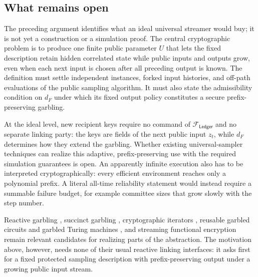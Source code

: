 \subsection{What remains open}

The preceding argument identifies what an ideal universal streamer would buy;
it is not yet a construction or a simulation proof. The central cryptographic
problem is to produce one finite public parameter $U$ that lets the fixed
description retain hidden correlated state while public inputs and outputs
grow, even when each next input is chosen after all preceding output is known.
The definition must settle independent instances, forked input histories, and
off-path evaluations of the public sampling algorithm. It must also state the
admissibility condition on $d_F$ under which its fixed output policy constitutes
a secure prefix-preserving garbling.

At the ideal level, new recipient keys require no command of
$\mathcal F_{\mathsf{Ledger}}$ and no separate linking party: the keys are
fields of the next public input $z_t$, while $d_F$ determines how they extend
the garbling. Whether existing universal-sampler techniques can realize this
adaptive, prefix-preserving use with the required simulation guarantees is open. An
apparently infinite execution also has to be interpreted
cryptographically: every efficient environment reaches only a polynomial
prefix. A literal all-time reliability statement would instead require a
summable failure budget, for example committee sizes that grow slowly with
the step number.

Reactive garbling \cite{NielsenRanellucci2015ReactiveGarbling}, succinct
garbling \cite{LinPass2014SuccinctGarbling}, cryptographic iterators
\cite{KoppulaLewkoWaters2014IOTM}, reusable garbled circuits and garbled
Turing machines
\cite{GoldwasserEtAl2012ReusableGarbling,GoldwasserEtAl2013TuringMachines},
and streaming functional encryption
\cite{GuanKorbSahai2022StreamingFE,BhushanKorbSahai2024StreamingFE,DattaGuanKorbSahai2024AdaptiveStreamingFE}
remain relevant candidates for realizing parts of the abstraction. The
motivation above, however, needs none of their usual reactive linking
interfaces: it asks first for a fixed protected sampling description with
prefix-preserving output under a growing public input stream.
